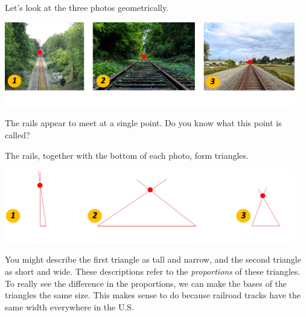 \documentclass{ximera}
\begin{document}
\begin{exploration}\label{exp:trianglesAtBase}
    Let's look at the three photos geometrically.  
    
\begin{image}
         \includegraphics[width=5in]{vanishingPoint.jpg}
\end{image}
    
    The rails appear to meet at a single point.  Do you know what this point is called?
    \begin{multipleChoice}
    \end{multipleChoice}

The rails, together with the bottom of each photo, form triangles.  

\begin{image}
         \includegraphics[width=5in]{triangles.jpg}
\end{image}

You might describe the first triangle as tall and narrow, and the second triangle as short and wide.  These descriptions refer to the \emph{proportions} of these triangles.  To really see the difference in the proportions, we can make the bases of the triangles the same size.  This makes sense to do because railroad tracks have the same width everywhere in the U.S.


\end{exploration}
\end{document}

